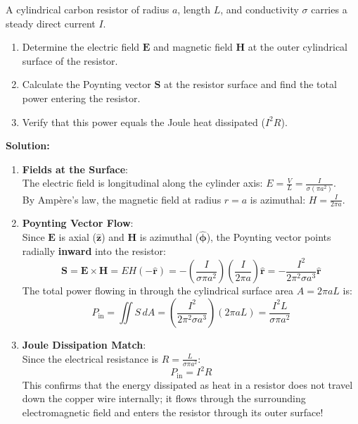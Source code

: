 \begin{example}
A cylindrical carbon resistor of radius $a$, length $L$, and conductivity $\sigma$ carries a steady direct current $I$.
\begin{enumerate}
    \item Determine the electric field $\mathbf{E}$ and magnetic field $\mathbf{H}$ at the outer cylindrical surface of the resistor.
    \item Calculate the Poynting vector $\mathbf{S}$ at the resistor surface and find the total power entering the resistor.
    \item Verify that this power equals the Joule heat dissipated ($I^2 R$).
\end{enumerate}

\textbf{Solution:}
\begin{enumerate}
    \item \textbf{Fields at the Surface}:\\
    The electric field is longitudinal along the cylinder axis: $E = \frac{V}{L} = \frac{I}{\sigma (\pi a^2)}$.\\
    By Ampère's law, the magnetic field at radius $r = a$ is azimuthal: $H = \frac{I}{2\pi a}$.
    
    \item \textbf{Poynting Vector Flow}:\\
    Since $\mathbf{E}$ is axial ($\hat{\mathbf{z}}$) and $\mathbf{H}$ is azimuthal ($\hat{\boldsymbol{\phi}}$), the Poynting vector points radially \textbf{inward} into the resistor:
    \begin{equation*}
        \mathbf{S} = \mathbf{E} \times \mathbf{H} = E H (-\hat{\mathbf{r}}) = -\left( \frac{I}{\sigma \pi a^2} \right) \left( \frac{I}{2\pi a} \right)\hat{\mathbf{r}} = -\frac{I^2}{2\pi^2 \sigma a^3}\hat{\mathbf{r}}
    \end{equation*}
    The total power flowing in through the cylindrical surface area $A = 2\pi a L$ is:
    \begin{equation*}
        P_{\text{in}} = \iint S\, dA = \left( \frac{I^2}{2\pi^2 \sigma a^3} \right)(2\pi a L) = \frac{I^2 L}{\sigma \pi a^2}
    \end{equation*}
    
    \item \textbf{Joule Dissipation Match}:\\
    Since the electrical resistance is $R = \frac{L}{\sigma \pi a^2}$:
    \begin{equation*}
        P_{\text{in}} = I^2 R
    \end{equation*}
    This confirms that the energy dissipated as heat in a resistor does not travel down the copper wire internally; it flows through the surrounding electromagnetic field and enters the resistor through its outer surface!
\end{enumerate}
\end{example}

